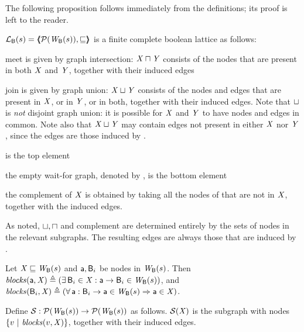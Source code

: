 The following proposition follows immediately from the definitions; its proof is left to the reader.
\begin{proposition} \label{prop:isALattice}
$\mathcal{L}_{\mathsf{B}}({s}) = \langle \hspace{-0.34em} \langle \hspace{-0.34em} \langle  \mathcal{P}(\mathit{W}_{\mathsf{B}}({s})), \sqsubseteq  \rangle \hspace{-0.34em} \rangle \hspace{-0.34em} \rangle$ is a finite complete boolean lattice as follows:
\be

\item meet is given by graph intersection: 
$\mathit{X} \sqcap \mathit{Y}$ consists of the nodes that are present in both $\mathit{X}$ and $\mathit{Y}$, together with their induced edges

\item join is given by graph union: $\mathit{X} \sqcup \mathit{Y}$ consists of the nodes and edges that are present in $\mathit{X}$, or in $\mathit{Y}$, or in both, together with their
  induced edges.
 Note that $\sqcup$ is \emph{not} disjoint graph union: 
it is possible for $\mathit{X}$ and $\mathit{Y}$ to have nodes and edges in common. Note also that $\mathit{X} \sqcup \mathit{Y}$ may contain edges not present in either $\mathit{X}$ nor $\mathit{Y}$,
since the edges are those induced by  . 

\item {}  is the top element 

\item  the empty wait-for graph, denoted by \ewfg, is the bottom element

\item the complement \compl{\XS} of $\mathit{X}$ is obtained by taking all the nodes of  that are not in $\mathit{X}$, together with the induced edges.
\ee
\end{proposition}
%
As noted, $\sqcup, \sqcap$ and complement are determined entirely by the sets of nodes in the relevant subgraphs. The resulting edges are always those
that are induced by .



\begin{definition} \label{defn:blocks} 
Let $\mathit{X} \sqsubseteq \mathit{W}_{\mathsf{B}}({s})$ and $\mathsf{a}, \mathsf{B}_i$ be nodes in $\mathit{W}_{\mathsf{B}}({s})$. Then 
$\mathit{blocks}(\mathsf{a}, \mathit{X}) \triangleq (\exists\, \mathsf{B}_i \in \mathit{X} : \mathsf{a} \rightarrow \mathsf{B}_i \in \mathit{W}_{\mathsf{B}}({s}))$, and 
$\mathit{blocks}(\mathsf{B}_i, \mathit{X}) \triangleq (\forall\, \mathsf{a} : \mathsf{B}_i \rightarrow \mathsf{a} \in \mathit{W}_{\mathsf{B}}({s}) \Rightarrow \mathsf{a} \in \mathit{X})$.
\end{definition}

\begin{definition}[$\SFs$]  \label{defn:scFix} 
Define $\mathcal{S}: \mathcal{P}(\mathit{W}_{\mathsf{B}}({s})) \to \mathcal{P}(\mathit{W}_{\mathsf{B}}({s}))$ as follows.
$\mathcal{S}(\mathit{X})$ is the subgraph with nodes $\{ v ~|~ \mathit{blocks}(v, \mathit{X})  \}$, together with their induced edges.
\end{definition}

